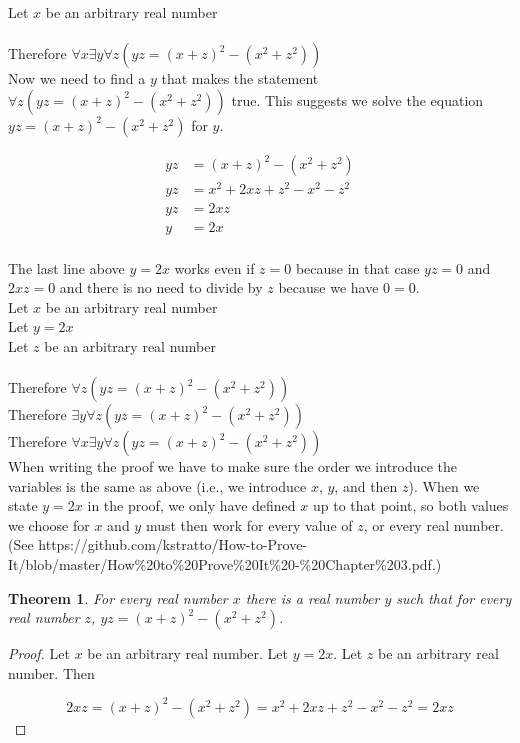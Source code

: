 \documentclass{article}
\newcommand{\n}{ \noindent }
\newtheorem*{theorem}{Theorem}  %
\begin{document}
\n Let $x$ be an arbitrary real number \\
\indent [proof of $\exists y \forall z (yz = (x + z)^2 - (x^2 + z^2))$] \\
\n Therefore $\forall x \exists y \forall z (yz = (x + z)^2 - (x^2 + z^2))$ \\

\n Now we need to find a $y$ that makes the statement $\forall z (yz = (x + z)^2 - (x^2 + z^2))$ true. This suggests we solve the equation $yz = (x + z)^2 - (x^2 + z^2)$ for $y$.

\begin{align*}
yz &= (x + z)^2 - (x^2 + z^2) \\
yz &= x^2 + 2xz + z^2 - x^2 - z^2 \\
yz &= 2xz \\
y &= 2x \\
\end{align*}

\n The last line above $y = 2x$ works even if $z = 0$ because in that case $yz = 0$ and $2xz = 0$ and there is no need to divide by $z$ because we have $0 = 0$. \\


\n Let $x$ be an arbitrary real number \\
\indent Let $y = 2x$ \\
\indent \indent Let $z$ be an arbitrary real number \\
\indent \indent \indent [proof of $yz = (x + z)^2 - (x^2 + z^2)$] \\
\indent \indent Therefore $\forall z (yz = (x + z)^2 - (x^2 + z^2))$ \\
\indent Therefore $\exists y \forall z (yz = (x + z)^2 - (x^2 + z^2))$ \\
\n Therefore $\forall x \exists y \forall z (yz = (x + z)^2 - (x^2 + z^2))$ \\

\n When writing the proof we have to make sure the order we introduce the variables is the same as above (i.e., we introduce $x$, $y$, and then $z$). When we state $y = 2x$ in the proof, we only have defined $x$ up to that point, so both values we choose for $x$ and $y$ must then work for every value of $z$, or every real number. (See https://github.com/kstratto/How-to-Prove-It/blob/master/How\%20to\%20Prove\%20It\%20-\%20Chapter\%203.pdf.)

\begin{theorem} For every real number $x$ there is a real number $y$ such that for every real number $z$, $yz = (x + z)^2 - (x^2 + z^2)$.
\end{theorem}
\begin{proof}
Let $x$ be an arbitrary real number. Let $y = 2x$. Let $z$ be an arbitrary real number. Then

\begin{equation*}
2xz = (x + z)^2 - (x^2 + z^2) = x^2 + 2xz + z^2 - x^2 - z^2 = 2xz
\end{equation*}
\end{proof}
\end{document}
